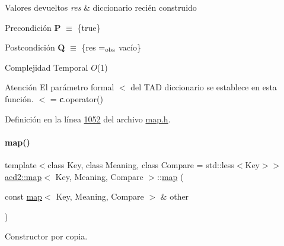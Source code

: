 \begin{DoxyRetVals}{Valores devueltos}
{\em res} & diccionario recién construido\\
\hline
\end{DoxyRetVals}
\begin{DoxyPrecond}{Precondición}
{\bfseries P} $\equiv$ \{true\} 
\end{DoxyPrecond}
\begin{DoxyPostcond}{Postcondición}
{\bfseries Q} $\equiv$ \{res $=_{\rm obs}$ vacío\}
\end{DoxyPostcond}

\begin{DoxyDescription}
\item[Complejidad Temporal]$O$(1)
\end{DoxyDescription}

\begin{DoxyAttention}{Atención}
El parámetro formal $<$ del T\+AD diccionario se establece en esta función. $<$ = {\bfseries c}.operator() 
\end{DoxyAttention}


Definición en la línea \hyperlink{map_8h_source_l01052}{1052} del archivo \hyperlink{map_8h_source}{map.\+h}.

\mbox{\label{classaed2_1_1map_a7a77950a3d8e637bfa7cf5dcd904f257_a7a77950a3d8e637bfa7cf5dcd904f257}} 
\paragraph{\texorpdfstring{map()}{map()}\hspace{0.1cm}{\footnotesize\ttfamily [2/3]}}
{\footnotesize\ttfamily template$<$class Key, class Meaning, class Compare = std\+::less$<$\+Key$>$$>$ \\
\hyperlink{classaed2_1_1map}{aed2\+::map}$<$ Key, Meaning, Compare $>$\+::\hyperlink{classaed2_1_1map}{map} (\begin{DoxyParamCaption}\item[{const \hyperlink{classaed2_1_1map}{map}$<$ Key, Meaning, Compare $>$ \&}]{other }\end{DoxyParamCaption})\hspace{0.3cm}{\ttfamily [inline]}}



Constructor por copia. 


